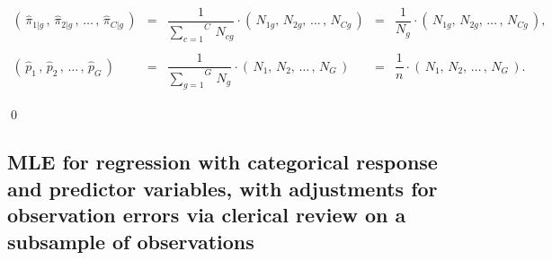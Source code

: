 \begin{enumerate}
\begin{equation*}
\begin{array}{ccccc}
		\left(\,\widehat{\pi}_{1\vert g}\,,\,\widehat{\pi}_{2\vert g}\,, \,\ldots\,, \,\widehat{\pi}_{C\vert g}\,\right)
		& = & \dfrac{1}{\overset{C}{\underset{c=1}{\sum}}\,N_{cg}} \cdot \left(\,N_{1g},\,N_{2g}, \,\ldots\,,\, N_{Cg}\,\right)
		& = & \dfrac{1}{N_{g}} \cdot \left(\,N_{1g},\,N_{2g}, \,\ldots\,,\, N_{Cg}\,\right),
		\\ \\
		\left(\,\widehat{p}_{1}\,,\,\widehat{p}_{2}\,, \,\ldots\,, \,\widehat{p}_{G}\,\right)
		& = & \dfrac{1}{\overset{G}{\underset{g=1}{\sum}}\,N_{g}} \cdot \left(\,N_{1},\,N_{2}, \,\ldots\,,\, N_{G}\,\right)
		& = & \dfrac{1}{n} \cdot \left(\,N_{1},\,N_{2}, \,\ldots\,,\, N_{G}\,\right).
		\end{array}
	\end{equation*}
\end{enumerate}
\qed


\subsection{MLE for regression with categorical response and predictor variables,
with adjustments for observation errors via clerical review on a subsample of observations}


